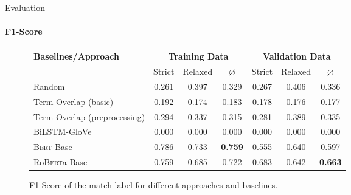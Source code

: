 \documentclass[english,handout]{mlutalk}
\newcommand{\BiLSTM}{\mbox{BiLSTM}\xspace}
\newcommand{\Bert}{\textsc{Bert}\xspace}
\newcommand{\BertBase}{\Bert-Base\xspace}
\newcommand{\Roberta}{\mbox{Ro\textsc{Bert}a}\xspace}
\newcommand{\RobertaBase}{\Roberta-Base\xspace}
\renewcommand{\lg}{\color{lightgray}}
\begin{document}
\begin{frame}{Evaluation}
  \framesubtitle{F1-Score}
  \begin{figure}
    \centering
    \caption{F1-Score of the match label for different approaches and baselines.}
    \scriptsize
    \begin{tabular}{lcccccc}
      \toprule
      \textbf{Baselines/Approach} & \multicolumn{3}{c}{\textbf{Training Data}} & \multicolumn{3}{c}{\textbf{Validation Data}} \\
      \cmidrule(r{0.5em}){2-4} \cmidrule(l{0.5em}){5-7}
      & Strict & Relaxed & \(\varnothing\) & Strict & Relaxed & \(\varnothing\) \\
      \midrule
      Random 
      & 0.261 & 0.397 & 0.329 & 0.267 & 0.406 & 0.336 \\
      Term Overlap (basic)
      & 0.192 & 0.174 & 0.183 & 0.178 & 0.176 & 0.177 \\
      Term Overlap (preprocessing)
      & 0.294 & 0.337 & 0.315 & 0.281 & 0.389 & 0.335 \\
      \midrule
      \lg\BiLSTM-GloVe
      & \lg0.000 & \lg0.000 & \lg0.000 & \lg0.000 & \lg0.000 & \lg0.000 \\
      \BertBase
      & 0.786 & 0.733 & \textbf{\underline{0.759}} & 0.555 & 0.640 & 0.597 \\
      \RobertaBase
      & 0.759 & 0.685 & 0.722 & 0.683 & 0.642 & \textbf{\underline{0.663}} \\
      \bottomrule
    \end{tabular}
  \end{figure}
\end{frame}
\end{document}
